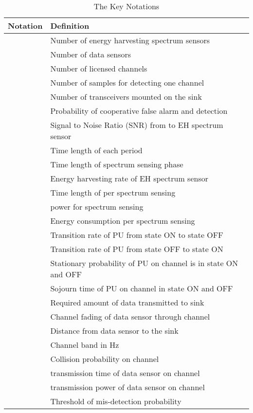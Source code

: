 \documentclass[journal]{IEEEtran} \ifCLASSINFOpdf
\begin{document}
\begin{table}[!t]
    \caption{The Key Notations}
    \centering
    \small
    \begin{tabular}{p{1.5cm}|p{6.6cm}}
         \hline
         \hline \textbf{Notation} & \textbf{Definition} \\
         \hline
         \hline
          & Number of energy harvesting spectrum sensors \\
          & Number of data sensors\\
          & Number of licensed channels\\
          & Number of samples for detecting one channel\\
          & Number of transceivers mounted on the sink \\
          & Probability of cooperative false alarm and detection\\
          & Signal to Noise Ratio (SNR) from  to EH spectrum sensor   \\
          & Time length of each period\\
          & Time length of spectrum sensing phase\\
          & Energy harvesting rate of EH spectrum sensor  \\
          & Time length of per spectrum sensing  \\
          & power for spectrum sensing\\
          & Energy consumption per spectrum sensing \\
          &  Transition rate of PU from state ON to state OFF\\
          &  Transition rate of PU from state OFF to state ON \\
          &  Stationary probability of PU on channel  is in state ON and OFF \\
          &  Sojourn time of PU on channel  in state ON and OFF   \\
          & Required amount of data transmitted to sink\\
          & Channel fading of data sensor  through channel \\
          & Distance from data sensor  to the sink\\
          &  Channel band in Hz\\
          & Collision probability on channel  \\
          &  transmission time of data sensor  on channel \\
          &  transmission power of data sensor  on channel \\
          & Threshold of mis-detection probability \\
         \hline
    \end{tabular}
    \label{tab_symbol}
\end{table}
\end{document}
